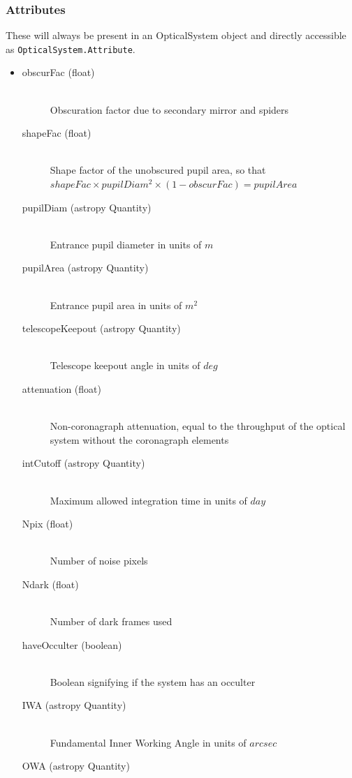 \documentclass[cleanfoot]{asme2ej}
\begin{document}
\subsubsection*{Attributes}
These will always be present in an OpticalSystem object and directly accessible as \verb+OpticalSystem.Attribute+.
\begin{itemize}
\item 
\begin{description}
    \item[obscurFac (float)] \hfill \\
    Obscuration factor due to secondary mirror and spiders
    \item[shapeFac (float)] \hfill \\
    Shape factor of the unobscured pupil area, so that $ shapeFac \times pupilDiam^2  \times (1-obscurFac) = pupilArea $
    \item[pupilDiam (astropy Quantity)] \hfill \\
    Entrance pupil diameter in units of $ m $
    \item[pupilArea (astropy Quantity)] \hfill \\
    Entrance pupil area in units of $ m^{2} $
    \item[telescopeKeepout (astropy Quantity)] \hfill \\
    Telescope keepout angle in units of $ deg $
    \item[attenuation (float)] \hfill \\
    Non-coronagraph attenuation, equal to the throughput of the optical system without the coronagraph elements
    \item[intCutoff (astropy Quantity)] \hfill \\
    Maximum allowed integration time in units of $ day $
    \item[Npix (float)] \hfill \\ 
    Number of noise pixels
    \item[Ndark (float)] \hfill \\ 
    Number of dark frames used
    \item[haveOcculter (boolean)] \hfill \\ 
    Boolean signifying if the system has an occulter
    \item[IWA (astropy Quantity)] \hfill \\
    Fundamental Inner Working Angle in units of $ arcsec $
    \item[OWA (astropy Quantity)] \hfill \\

\end{description}
\end{itemize}
\end{document}
